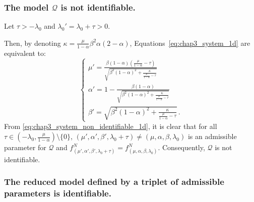 \begin{subappendices}
\subsubsection*{The model $\mathcal{Q}$ is not identifiable.}
            Let $\tau> -\lambda_0$ and $\lambda_0' = \lambda_0 + \tau > 0$.
    
            Then, by denoting $\kappa = \frac{\mu}{1-\alpha} \beta^2\alpha (2-\alpha)$, Equations~\eqref{eq:chap3_system_1d} are equivalent to:
            \begin{equation}\label{eq:chap3_system_non_identifiable_1d}
            \begin{cases}
              \mu' = \frac{\beta(1-\alpha) (\frac{\mu}{1-\alpha}-\tau)}{\sqrt{\beta^2(1-\alpha)^2 + \frac{\kappa}{\frac{\mu}{1-\alpha}-\tau}}} \\
              \alpha' = 1 - \frac{\beta(1 - \alpha)}{\sqrt{\beta^2(1-\alpha)^2 + \frac{\kappa}{\frac{\mu}{1-\alpha}-\tau}}} \\
              \beta' = \sqrt{\beta^2(1-\alpha)^2 + \frac{\kappa}{\frac{\mu}{1-\alpha}-\tau}}\,.
            \end{cases}
            \end{equation}
      From \eqref{eq:chap3_system_non_identifiable_1d}, it is clear that for all $\tau\in \left(-\lambda_0, \frac{\mu}{1-\alpha} \right)\setminus\{0\}$,
            $(\mu', \alpha', \beta', \lambda_0 + \tau) \neq (\mu, \alpha, \beta, \lambda_0) $ is an admissible parameter for $\mathcal Q$ and
            $f_{(\mu', \alpha', \beta', \lambda_0 + \tau)}^N = f_{(\mu, \alpha, \beta, \lambda_0)}^N$.
            Consequently, $\mathcal Q$ is not identifiable.
            
                              
\subsubsection*{The reduced model defined by a triplet of admissible parameters is identifiable.}
                  

\end{subappendices}
